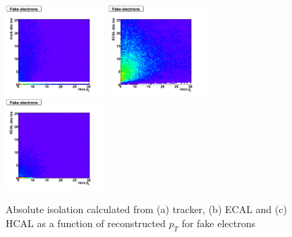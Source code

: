  \begin{figure}[htbp]
    \includegraphics[width = 0.33\textwidth]{pictures/recoPt_absIso/trackIso_elec_fake.png}
    \includegraphics[width = 0.33\textwidth]{pictures/recoPt_absIso/ecalIso_elec_fake.png}
    \includegraphics[width = 0.33\textwidth]{pictures/recoPt_absIso/hcalIso_elec_fake.png}
    \caption{Absolute isolation calculated from (a) tracker, (b) ECAL and (c) HCAL  as a function of
       reconstructed $p_{T}$ for fake electrons}
    \label{fig:FakeElecRecoPt_AbsIso}
 \end{figure}

